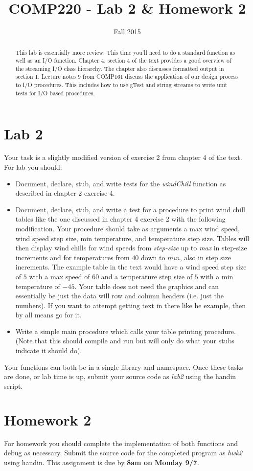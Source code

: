 \documentclass[10pt]{article}
\title{COMP220 - Lab 2 \& Homework 2}
\author{ }
\date{Fall 2015}
\begin{document}
\maketitle

\begin{abstract}
This lab is essentially more review. This time you'll need to do a standard function as well as an I/O function. Chapter 4, section 4 of the text provides a good overview of the streaming I/O class hierarchy. The chapter also discusses formatted output in section 1. Lecture notes 9 from COMP161 discuss the application of our design process to I/O procedures.  This includes how to use gTest and string streams to write unit tests for I/O based procedures. 
\end{abstract}

\section{Lab 2}

Your task is a slightly modified version of exercise 2 from chapter 4 of the text. For lab you should:
\begin{itemize}
\item Document, declare, stub, and write tests for the \textit{windChill} function as described in chapter 2 exercise 4.

\item Document, declare, stub, and write a test for a procedure to print wind chill tables like the one discussed in chapter 4 exercise 2 with the following modification. Your procedure should take as arguments a max wind speed, wind speed step size, min temperature, and temperature step size. Tables will then display wind chills for wind speeds from \textit{step-size} up to \textit{max} in step-size increments and for temperatures from $40$ down to $min$, also in step size increments. The example table in the text would have a wind speed step size of $5$ with a max speed of $60$ and a temperature step size of $5$ with a min temperature of $-45$. Your table does not need the graphics and can essentially be just the data will row and column headers (i.e. just the numbers). If you want to attempt getting text in there like he example, then by all means go for it. 

\item Write a simple main procedure which calls your table printing procedure. (Note that this should compile and run but will only do what your stubs indicate it should do).
\end{itemize}
Your functions can both be in a single library and namespace. Once these tasks are done, or lab time is up, submit your source code as \textit{lab2} using the handin script. 

\section{Homework 2}

For homework you should complete the implementation of both functions and debug as necessary. Submit the source code for the completed program as \textit{hwk2} using handin. This assignment is due by \textbf{8am on Monday 9/7}.
\end{document}

